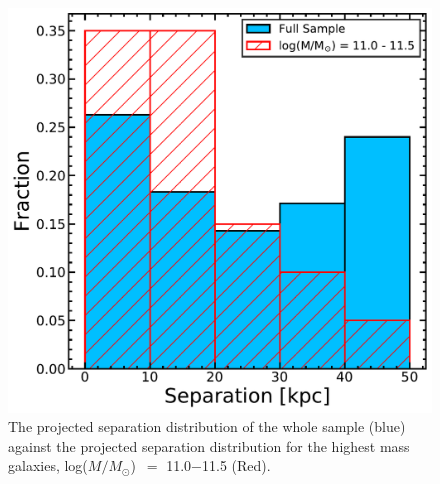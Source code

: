 \documentclass[apj,twocolumn]{emulateapj}
\newcommand{\logm}{log($M/M_{\odot}$)}
\begin{document}
\begin{CJK*}{UTF8}{gbsn}
\begin{figure}
\centering
\includegraphics[width=0.8\linewidth]{sep_hist.pdf}
\caption[]{The projected separation distribution of the whole sample (blue) against the projected separation distribution for the highest mass galaxies, \logm\ $=$ 11.0$-$11.5 (Red). }
\label{fig:sep_hist}
\end{figure}


\end{CJK*}
\end{document}
